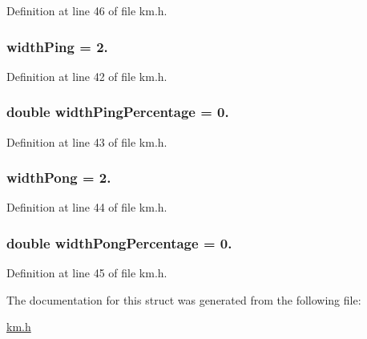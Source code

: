 Definition at line 46 of file km.\+h.

\subsubsection[{\texorpdfstring{width\+Ping}{widthPing}}]{ width\+Ping = 2.}\hypertarget{struct_k_1_1m_quoting_params_a4279c166f3d233d69f15f23174b015f5}{}\label{struct_k_1_1m_quoting_params_a4279c166f3d233d69f15f23174b015f5}


Definition at line 42 of file km.\+h.

\subsubsection[{\texorpdfstring{width\+Ping\+Percentage}{widthPingPercentage}}]{\setlength{\rightskip}{0pt plus 5cm}double width\+Ping\+Percentage = 0.}\hypertarget{struct_k_1_1m_quoting_params_ae713d32ed4985ea64a75a3b67ed2e4d9}{}\label{struct_k_1_1m_quoting_params_ae713d32ed4985ea64a75a3b67ed2e4d9}


Definition at line 43 of file km.\+h.

\subsubsection[{\texorpdfstring{width\+Pong}{widthPong}}]{ width\+Pong = 2.}\hypertarget{struct_k_1_1m_quoting_params_a259c285d2a55a58a4c5e87f58e18765d}{}\label{struct_k_1_1m_quoting_params_a259c285d2a55a58a4c5e87f58e18765d}


Definition at line 44 of file km.\+h.

\subsubsection[{\texorpdfstring{width\+Pong\+Percentage}{widthPongPercentage}}]{\setlength{\rightskip}{0pt plus 5cm}double width\+Pong\+Percentage = 0.}\hypertarget{struct_k_1_1m_quoting_params_acff9ae46960bbd2d759586223fa57081}{}\label{struct_k_1_1m_quoting_params_acff9ae46960bbd2d759586223fa57081}


Definition at line 45 of file km.\+h.



The documentation for this struct was generated from the following file\+:\begin{DoxyCompactItemize}
\item 
\hyperlink{km_8h}{km.\+h}\end{DoxyCompactItemize}
